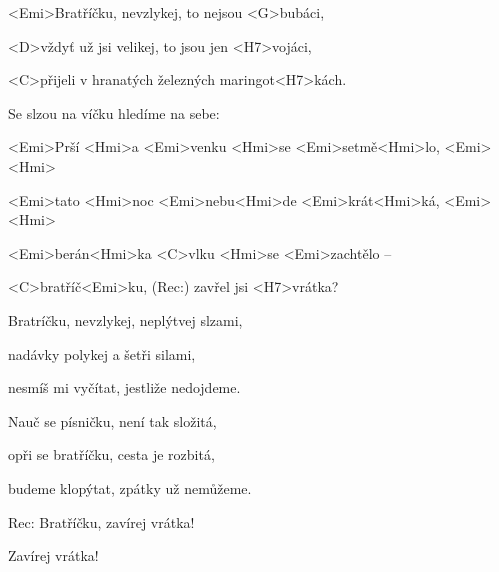 

\zs
<Emi>Bratříčku, nevzlykej, to nejsou <G>bubáci,

<D>vždyť už jsi velikej, to jsou jen <H7>vojáci,

<C>přijeli v hranatých železných maringot<H7>kách.

Se slzou na víčku hledíme na sebe:

\ks

\zr
<Emi>Prší <Hmi>a <Emi>venku <Hmi>se <Emi>setmě<Hmi>lo, <Emi> <Hmi>

<Emi>tato <Hmi>noc <Emi>nebu<Hmi>de <Emi>krát<Hmi>ká, <Emi> <Hmi>

<Emi>berán<Hmi>ka <C>vlku <Hmi>se <Emi>zachtělo --

<C>bratříč<Emi>ku, (Rec:) zavřel jsi <H7>vrátka?
\kr

\zs
Bratríčku, nevzlykej, neplýtvej slzami,

nadávky polykej a šetři silami,

nesmíš mi vyčítat, jestliže nedojdeme.

Nauč se písničku, není tak složitá,

opři se bratříčku, cesta je rozbitá,

budeme klopýtat, zpátky už nemůžeme.
\ks

\zr
\kr

Rec: Bratříčku, zavírej vrátka!

Zavírej vrátka!

\kp
